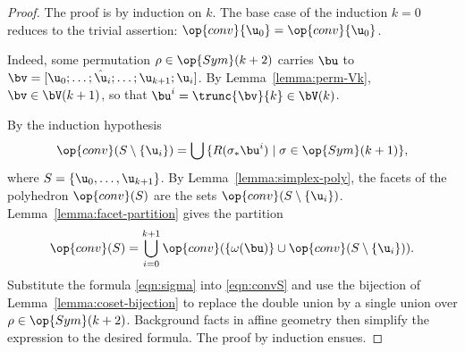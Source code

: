 \begin{proof} The proof is by induction on $k$.  The base case of the
  induction $k=0$ reduces to the trivial assertion: $\op{conv}\{\u_0\}
  = \op{conv}\{\u_0\}$.



    Indeed, some
  permutation $\rho\in \op{Sym}(k+2)$ carries $\bu$ to
  $\bv=[\u_0;\ldots;\hat\u_i;\ldots;\u_{k+1};\u_i]$.  By
  Lemma~\ref{lemma:perm-Vk}, $\bv\in \bV(k+1)$, so that $\bu^i =
  \trunc{\bv}{k}\in \bV(k)$.

  By the induction hypothesis
\begin{equation}\label{eqn:sigma} 
\op{conv}(S\setminus\{\u_i\}) = \bigcup \,\{ R(\sigma_*\bu^i) \mid \sigma\in \op{Sym}(k+1)\},
\end{equation}
where $S = \{\u_0,\ldots,\u_{k+1}\}$.  By
Lemma~\ref{lemma:simplex-poly}, the facets of the polyhedron
$\op{conv}(S)$ are the sets $\op{conv}(S\setminus\{\u_i\})$.
Lemma~\ref{lemma:facet-partition} gives the partition
\begin{equation} \label{eqn:convS}
\op{conv}(S) = \bigcup_{i=0}^{k+1} \op{conv}(\{\omega(\bu)\}
\cup \op{conv}(S\setminus\{\u_i\})).
\end{equation}
Substitute the formula \eqref{eqn:sigma} into \eqref{eqn:convS} and
use the bijection of Lemma~\ref{lemma:coset-bijection} to replace the
double union by a single union over $\rho\in \op{Sym}(k+2)$.
Background facts in affine geometry then simplify the expression to
the desired formula.  The proof by induction ensues.
%
%
%
\end{proof}



